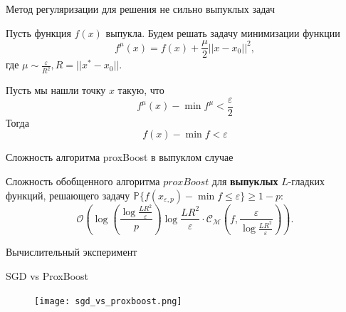 \documentclass{beamer}
\newcommand{\e}{\varepsilon}
\begin{document}
\begin{frame}{Метод регуляризации для решения не сильно выпуклых задач}
\begin{theorem}
    Пусть функция $f(x)$ выпукла. Будем решать задачу минимизации функции \[f^{\mu}(x) = f(x) + \frac{\mu}{2} ||x - x_0||^2,\] где $\mu \sim \frac{\e}{R^2}, R = ||x^* - x_0||$.

    Пусть мы нашли точку $x$ такую, что
    \[f^{\mu}(x) - \min f^{\mu} < \frac{\e}{2}\]
    Тогда 
    \[f(x) - \min f < \e\]
\end{theorem}
\end{frame}

\begin{frame}{Сложность алгоритма proxBoost в выпуклом случае}
\begin{theorem}
    Сложность обобщенного алгоритма $proxBoost$ для \textbf{выпуклых} $L$-гладких функций, решающего задачу $\mathds{P} \{f(x_{\e, p})-\min f \le \e\} \ge 1 - p$:
     \[\mathcal{O} \left( \log({\frac{\log{\frac{LR^2}{\e}}}{p}})\log{\frac{LR^2}{\e}}\cdot \mathcal{C}_{\mathcal{M}}(f, \frac{\e}{\log{\frac{LR^2}{\e}}})\right).\] 
\end{theorem}


\end{frame}





\begin{frame}{Вычислительный эксперимент}
\begin{block}{SGD vs ProxBoost}

     \begin{figure}
    \texttt{[image: sgd\_vs\_proxboost.png]}
    \end{figure}
\end{block}

     
 \end{frame}


\end{document}

